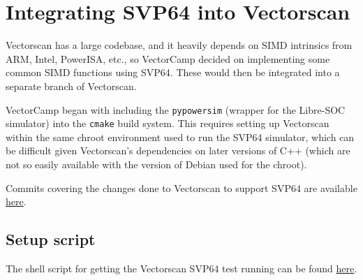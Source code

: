 %
\section{Integrating SVP64 into Vectorscan}

Vectorscan has a large codebase, and it heavily depends on SIMD intrinsics from
ARM, Intel, PowerISA, etc., so VectorCamp decided on implementing some common
SIMD functions using SVP64. These would then be integrated into a separate
branch of Vectorscan.

VectorCamp began with including the \texttt{pypowersim} (wrapper for the
Libre-SOC simulator) into the \texttt{cmake} build system. This requires
setting up Vectorscan within the same chroot environment used to run the SVP64
simulator, which can be difficult given Vectorscan's dependencies on later
versions of C++ (which are not so easily available with the version of Debian
used for the chroot).

Commits covering the changes done to Vectorscan to support SVP64 are available
\href{https://github.com/ngisearchsvp64/vectorscan/commits/feature/svp64-port/}{here}.

\subsection{Setup script}
The shell script for getting the Vectorscan SVP64 test running can be found
\href{https://github.com/ngisearchsvp64/shell-scripts/blob/main/scripts/ngi-search-vectorscan}{here}.

